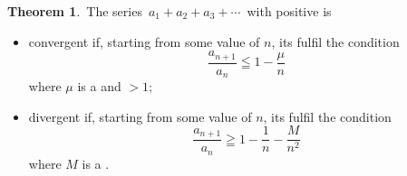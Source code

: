 \documentclass[12pt]{article}
\theoremstyle{definition}
\newtheorem*{thmplain}{Theorem}
\begin{document}
\begin{thmplain}
\,The series\, $a_1\!+\!a_2\!+\!a_3\!+\cdots$\, with positive  is
\begin{itemize}
 \item convergent if, starting from some value of $n$, its  fulfil the condition
   $$\frac{a_{n+1}}{a_n} \leqq 1-\frac{\mu}{n}$$
where $\mu$ is a  and $> 1$;
 \item divergent if, starting from some value of $n$, its  fulfil the condition
   $$\frac{a_{n+1}}{a_n} \geqq 1-\frac{1}{n}-\frac{M}{n^2}$$
where $M$ is a .
\end{itemize}
\end{thmplain}
\end{document}

